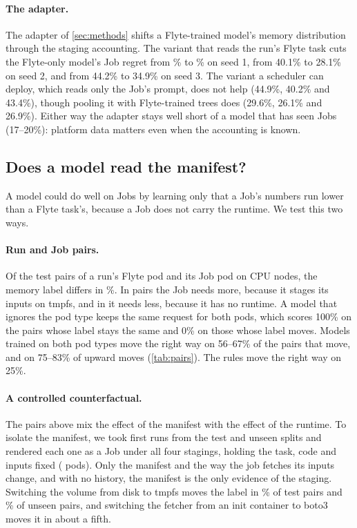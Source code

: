\paragraph{The adapter.}
The adapter of \cref{sec:methods} shifts a Flyte-trained model's memory distribution through the staging
accounting. The variant that reads the run's Flyte task cuts the Flyte-only model's Job regret from
\rTestDecFlyte\% to \rTestDecAdapt\% on seed 1, from 40.1\% to 28.1\% on seed 2, and from 44.2\% to 34.9\% on seed 3.
The variant a scheduler can deploy, which reads only the Job's prompt, does not help (44.9\%, 40.2\% and 43.4\%),
though pooling it with Flyte-trained trees does (29.6\%, 26.1\% and 26.9\%). Either way the adapter stays well short
of a model that has seen Jobs (17--20\%): platform data matters even when the accounting is known.

\subsection{Does a model read the manifest?}
\label{sec:res-manifest}

A model could do well on Jobs by learning only that a Job's numbers run lower than a Flyte task's, because a Job
does not carry the runtime. We test this two ways.

\paragraph{Run and Job pairs.}
Of the \pairsN{} test pairs of a run's Flyte pod and its Job pod on CPU nodes, the memory label differs in
\pairsMoved\%. In \pairsUp{} pairs the Job needs more, because it stages its inputs on tmpfs, and in \pairsDown{} it
needs less, because it has no runtime. A model that ignores the pod type keeps the same request for both pods,
which scores 100\% on the pairs whose label stays the same and 0\% on those whose label moves. Models trained on
both pod types move the right way on 56--67\% of the pairs that move, and on 75--83\% of upward moves
(\cref{tab:pairs}). The rules move the right way on 25\%.

\paragraph{A controlled counterfactual.}
The pairs above mix the effect of the manifest with the effect of the runtime. To isolate the manifest, we took
\cfRuns{} first runs from the test and unseen splits and rendered each one as a Job under all four stagings,
holding the task, code and inputs fixed (\cfRend{} pods). Only the manifest and the way the job fetches its inputs
change, and with no history, the manifest is the only evidence of the staging. Switching the volume from disk to
tmpfs moves the label in \cfMediumMovedTest\% of test pairs and \cfMediumMovedOod\% of unseen pairs, and switching
the fetcher from an init container to boto3 moves it in about a fifth.

